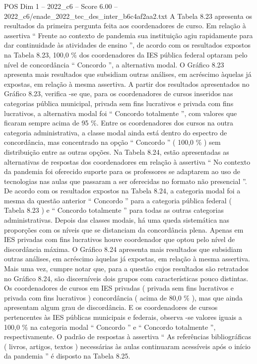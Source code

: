 \begin{textsample}{POS Dim 1 – 2022\_c6 – Score 6.00 – 2022\_c6/enade\_2022\_tec\_des\_inter\_b6c4af2aa2.txt}
A Tabela 8.23 apresenta os resultados da primeira pergunta feita aos coordenadores de curso.
Em relação à assertiva “ Frente ao contexto de pandemia sua instituição agiu rapidamente para dar continuidade às atividades de ensino ”, de acordo com os resultados expostos na Tabela 8.23, 100,0 \% dos coordenadores da IES pública federal optaram pelo nível de concordância “ Concordo ”, a alternativa modal.
O Gráfico 8.23 apresenta mais resultados que subsidiam outras análises, em acréscimo àquelas já expostas, em relação à mesma assertiva.
A partir dos resultados apresentados no Gráfico 8.23, verifica -se que, para os coordenadores de cursos inseridos nas categorias pública municipal, privada sem fins lucrativos e privada com fins lucrativos, a alternativa modal foi “ Concordo totalmente ”, com valores que ficaram sempre acima de 95 \%.
Entre os coordenadores dos cursos na outra categoria administrativa, a classe modal ainda está dentro do espectro de concordância, mas concentrado na opção “ Concordo ” ( 100,0 \% ) sem distribuição entre as outras opções.
Na Tabela 8.24, estão apresentadas as alternativas de respostas dos coordenadores em relação à assertiva “ No contexto da pandemia foi oferecido suporte para os professores se adaptarem ao uso de tecnologias nas aulas que passaram a ser oferecidas no formato não presencial ”.
De acordo com os resultados expostos na Tabela 8.24, a categoria modal foi a mesma da questão anterior “ Concordo ” para a categoria pública federal ( Tabela 8.23 ) e “ Concordo totalmente ” para todas as outras categorias administrativas.
Depois das classes modais, há uma queda sistemática nas proporções com os níveis que se distanciam da concordância plena.
Apenas em IES privadas com fins lucrativos houve coordenador que optou pelo nível de discordância máxima.
O Gráfico 8.24 apresenta mais resultados que subsidiam outras análises, em acréscimo àquelas já expostas, em relação à mesma assertiva.
Mais uma vez, cumpre notar que, para a questão cujos resultados são retratados no Gráfico 8.24, são discerníveis dois grupos com características pouco distintas.
Os coordenadores de cursos em IES privadas ( privada sem fins lucrativos e privada com fins lucrativos ) concordância ( acima de 80,0 \% ), mas que ainda apresentam algum grau de discordância.
E os coordenadores de cursos pertencentes às IES públicas municipais e federais, observa -se valores iguais a 100,0 \% na categoria modal “ Concordo ” e “ Concordo totalmente ”, respectivamente.
O padrão de respostas à assertiva “ As referências bibliográficas ( livros, artigos, textos ) necessárias às aulas continuaram acessíveis após o início da pandemia ” é disposto na Tabela 8.25.

\end{textsample}
